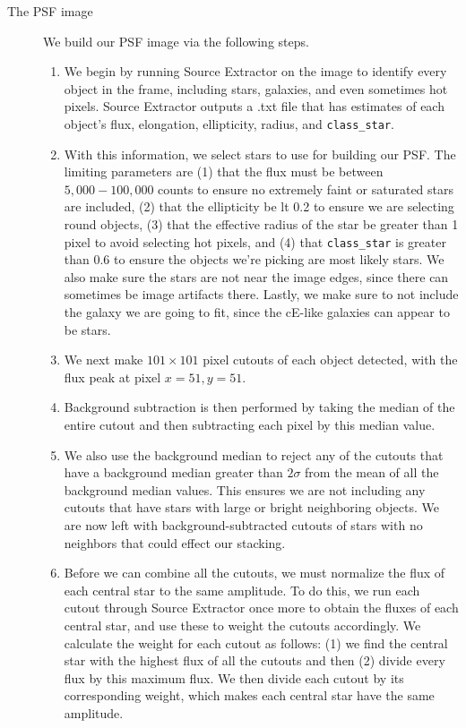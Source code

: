 \documentclass[iop,apj]{emulateapj}
\begin{document}
\begin{description}
\item[The PSF image]{We build our PSF image via the following steps.
\begin{enumerate}

\item We begin by running Source Extractor on the image to identify every object in the frame, including stars, galaxies, and even sometimes hot pixels. Source Extractor outputs a .txt file that has estimates of each object's flux, elongation, ellipticity, radius, and \texttt{class\_star}.

\item With this information, we select stars to use for building our PSF. The limiting parameters are (1) that the flux must be between $5,000-100,000$ counts to ensure no extremely faint or saturated stars are included, (2) that the ellipticity be lt 0.2 to ensure we are selecting round objects, (3) that the effective radius of the star be greater than 1 pixel to avoid selecting hot pixels, and (4) that \texttt{class\_star} is greater than 0.6 to ensure the objects we're picking are most likely stars. We also make sure the stars are not near the image edges, since there can sometimes be image artifacts there. Lastly, we make sure to not include the galaxy we are going to fit, since the cE-like galaxies can appear to be stars.

\item We next make $101\times101$ pixel cutouts of each object detected, with the flux peak at pixel $x=51,y=51$. 

\item Background subtraction is then performed by taking the median of the entire cutout and then subtracting each pixel by this median value.

\item We also use the background median to reject any of the cutouts that have a background median greater than $2\sigma$ from the mean of all the background median values. This ensures we are not including any cutouts that have stars with large or bright neighboring objects. We are now left with background-subtracted cutouts of stars with no neighbors that could effect our stacking. 

\item Before we can combine all the cutouts, we must normalize the flux of each central star to the same amplitude. To do this, we run each cutout through Source Extractor once more to obtain the fluxes of each central star, and use these to weight the cutouts accordingly. We calculate the weight for each cutout as follows: (1) we find the central star with the highest flux of all the cutouts and then (2) divide every flux by this maximum flux. We then divide each cutout by its corresponding weight, which makes each central star have the same amplitude.


\end{enumerate}}
\end{description}
\end{document}
